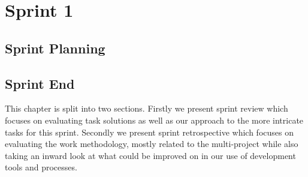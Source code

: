 \part{Sprint 1}
\chapter{Sprint Planning}


\chapter{Sprint End}
This chapter is split into two sections.
Firstly we present sprint review which focuses on evaluating task solutions as well as our approach to the more intricate tasks for this sprint.
Secondly we present sprint retrospective which focuses on evaluating the work methodology, mostly related to the multi-project while also taking an inward look at what could be improved on in our use of development tools and processes.






